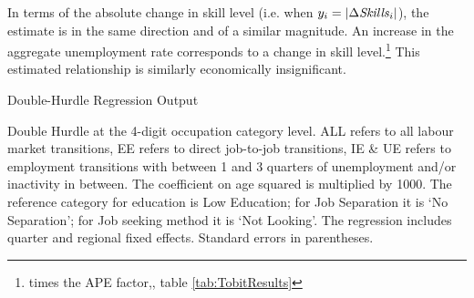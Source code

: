 \documentclass[12pt,authoryear]{elsarticle}
\begin{document}
	\vspace{2mm}
	
	In terms of the absolute change in skill level (i.e. when $y_i=|\Delta\text{\textit{Skills}}_{i}|$), the estimate is in the same direction and of a similar magnitude. An increase in the aggregate unemployment rate corresponds to a  change in skill level.\footnote{ times the APE factor,\hspace{-1mm}, table \ref{tab:TobitResults}} This estimated relationship is similarly economically insignificant.
	\newpage
	\thispagestyle{empty}
	\begin{table}[htbp]
		\centering
		\caption{Double-Hurdle Regression Output}\label{tab:TobitResults}
		\begin{adjustbox}{width=\textwidth}
			\begin{threeparttable}
				
				
				\begin{tablenotes}
					\item{\footnotesize{Double Hurdle at the 4-digit occupation category level. ALL refers to all labour market transitions, EE refers to direct job-to-job transitions, IE \& UE refers to employment transitions with between 1 and 3 quarters of unemployment and/or inactivity in between. The coefficient on age squared is multiplied by 1000. The reference category for education is Low Education; for Job Separation it is `No Separation';  for Job seeking method it is `Not Looking'. The regression includes quarter and regional fixed effects. Standard errors in parentheses.}}
				\end{tablenotes}
			\end{threeparttable}
		\end{adjustbox}
	\end{table}
	\restoregeometry %
	\newpage
	
\end{document}
